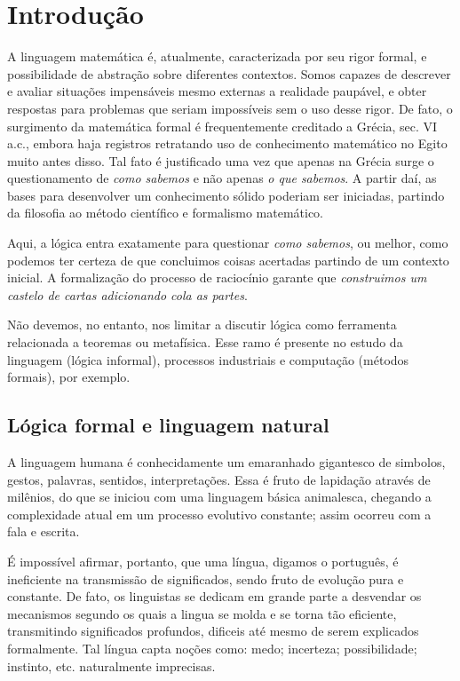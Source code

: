 \chapter{Introdução}
A linguagem matemática é, atualmente, caracterizada por seu rigor formal, e possibilidade de abstração sobre diferentes contextos. Somos capazes de descrever e avaliar situações impensáveis mesmo externas a realidade paupável, e obter respostas para problemas que seriam impossíveis sem o uso desse rigor. De fato, o surgimento da matemática formal é frequentemente creditado a Grécia, sec. VI a.c., embora haja registros retratando uso de conhecimento matemático no Egito muito antes disso. Tal fato é justificado uma vez que apenas na Grécia surge o questionamento de \textit{como sabemos} e não apenas \textit{o que sabemos}. A partir daí, as bases para desenvolver um conhecimento sólido poderiam ser iniciadas, partindo da filosofia ao método científico e formalismo matemático.

Aqui, a lógica entra exatamente para questionar \textit{como sabemos}, ou melhor, como podemos ter certeza de que concluimos coisas acertadas partindo de um contexto inicial. A formalização do processo de raciocínio garante que \textit{construimos um castelo de cartas adicionando cola as partes}.

Não devemos, no entanto, nos limitar a discutir lógica como ferramenta relacionada a teoremas ou metafísica. Esse ramo é presente no estudo da linguagem (lógica informal), processos industriais e computação (métodos formais), por exemplo. %

\section{Lógica formal e linguagem natural}
A linguagem humana é conhecidamente um emaranhado gigantesco de simbolos, gestos, palavras, sentidos, interpretações. Essa é fruto de lapidação através de milênios, do que se iniciou com uma linguagem básica animalesca, chegando a complexidade atual em um processo evolutivo constante; assim ocorreu com a fala e escrita.

É impossível afirmar, portanto, que uma língua, digamos o português, é ineficiente na transmissão de significados, sendo fruto de evolução pura e constante. De fato, os linguistas se dedicam em grande parte a desvendar os mecanismos segundo os quais a lingua se molda e se torna tão eficiente, transmitindo significados profundos, dificeis até mesmo de serem explicados formalmente. Tal língua capta noções como: medo; incerteza; possibilidade; instinto, etc. naturalmente imprecisas.

